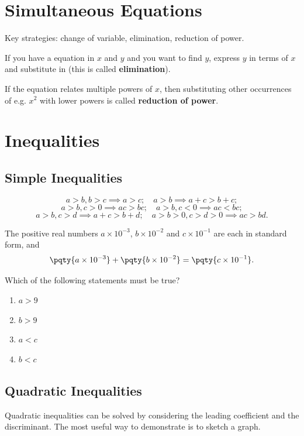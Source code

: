 \documentclass{article}
\begin{document}
\section{Simultaneous Equations}

Key strategies: change of variable, elimination, reduction of power.

If you have a equation in \(x\) and \(y\) and you want to find \(y\), express \(y\) in terms of \(x\) and substitute in (this is called \textbf{elimination}).

If the equation relates multiple powers of \(x\), then substituting other occurrences of e.g. \(x^2\) with lower powers is called \textbf{reduction of power}.

\section{Inequalities}
\subsection{Simple Inequalities}
\[
    a > b, b > c \implies a > c; \quad a > b \implies a + c > b + c;
\]
\[
    a > b, c > 0 \implies ac > bc; \quad a > b, c < 0 \implies ac < bc;
\]
\[
    a > b, c > d \implies a + c > b + d; \quad a > b > 0, c > d > 0 \implies ac > bd.
\]

\begin{example}[TMUA 2017 P2 Q13]
    The positive real numbers \(a \times 10^{-3}\), \(b \times 10^{-2}\) and \(c \times 10^{-1}\) are each in standard form, and
    \[
        \pqty{a \times 10^{-3}} + \pqty{b \times 10^{-2}} = \pqty{c \times 10^{-1}}.
    \]

    Which of the following statements must be true?
    \begin{enumerate}
        \item \(a > 9\)
        \item \(b > 9\)
        \item \(a < c\)
        \item \(b < c\)
    \end{enumerate}
\end{example}

\subsection{Quadratic Inequalities}
Quadratic inequalities can be solved by considering the leading coefficient and the discriminant. The most useful way to demonstrate is to sketch a graph.
\end{document}
